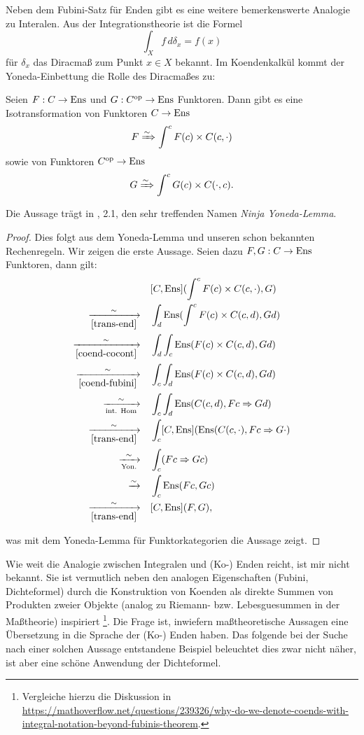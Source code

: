 Neben dem Fubini-Satz für Enden gibt es eine weitere bemerkenswerte
Analogie zu Interalen. Aus der Integrationstheorie ist die Formel
\[ \int_X f \, d\delta_x = f(x) \]
für $\delta_x$ das Diracmaß zum Punkt $x \in X$ bekannt. Im
Koendenkalkül kommt der Yoneda-Einbettung die Rolle des Diracmaßes zu:
\begin{prop} \label{coend-density}
  Seien $F: C \to \operatorname{Ens}$ und $G: C^\mathrm{op} \to \operatorname{Ens}$ Funktoren. Dann gibt es
  eine Isotransformation von Funktoren $C \to \operatorname{Ens}$
  \[ F \xRightarrow{\sim} \int^c F(c) \times C(c, \cdot) \]
  sowie von Funktoren $C^\mathrm{op} \to \operatorname{Ens}$
  \[ G \xRightarrow{\sim} \int^c G(c) \times C(\cdot, c). \]
\end{prop}
\begin{bem}
  Die Aussage trägt in \cite{Lore}, 2.1, den sehr treffenden Namen
  \emph{Ninja Yoneda-Lemma}.
\end{bem}
\begin{proof}
  Dies folgt aus dem Yoneda-Lemma und unseren schon bekannten
  Rechenregeln. Wir zeigen die erste Aussage. Seien dazu $F, G: C \to
  \operatorname{Ens}$ Funktoren, dann gilt:
  \begin{align*}
    &[C, \operatorname{Ens}](\int^c F(c) \times C(c, \cdot), G) \\
    \xrightarrow[\ref{trans-end}]{\sim} \quad
    &\int_d \operatorname{Ens}(\int^c F(c) \times C(c, d), Gd) \\
    \xrightarrow[\ref{coend-cocont}]{\sim} \quad
    &\int_d \int_c \operatorname{Ens}(F(c) \times C(c, d), Gd) \\
    \xrightarrow[\ref{coend-fubini}]{\sim} \quad
    &\int_c \int_d \operatorname{Ens}(F(c) \times C(c, d), Gd) \\
    \xrightarrow[\text{int. Hom}]{\sim} \quad
    &\int_c \int_d \operatorname{Ens}(C(c, d), Fc \Rightarrow Gd) \\
    \xrightarrow[\ref{trans-end}]{\sim} \quad
    &\int_c [C, \operatorname{Ens}](\operatorname{Ens}(C(c, \cdot), Fc \Rightarrow G \cdot) \\
    \xrightarrow[\text{Yon.}]{\sim} \quad
    &\int_c (Fc \Rightarrow Gc) \\
    \xrightarrow[]{\sim} \quad &\int_c \operatorname{Ens}(Fc, Gc) \\
    \xrightarrow[\ref{trans-end}]{\sim} \quad
    &[C, \operatorname{Ens}](F, G),
  \end{align*}
  
  was mit dem Yoneda-Lemma für Funktorkategorien die Aussage zeigt.
\end{proof}
\begin{bem}
  Wie weit die Analogie zwischen Integralen und (Ko-) Enden reicht,
  ist mir nicht bekannt. Sie ist vermutlich neben den analogen
  Eigenschaften (Fubini, Dichteformel) durch die Konstruktion von
  Koenden als direkte Summen von Produkten zweier Objekte (analog zu
  Riemann- bzw. Lebesguesummen in der Maßtheorie)
  inspiriert
  \footnote{Vergleiche hierzu die Diskussion in
    \url{https://mathoverflow.net/questions/239326/why-do-we-denote-coends-with-integral-notation-beyond-fubinis-theorem}.}.
  Die Frage ist, inwiefern maßtheoretische Aussagen eine Übersetzung
  in die Sprache der (Ko-) Enden haben. Das folgende bei der Suche
  nach einer solchen Aussage entstandene Beispiel beleuchtet dies zwar
  nicht näher, ist aber eine schöne Anwendung der Dichteformel.
\end{bem}
